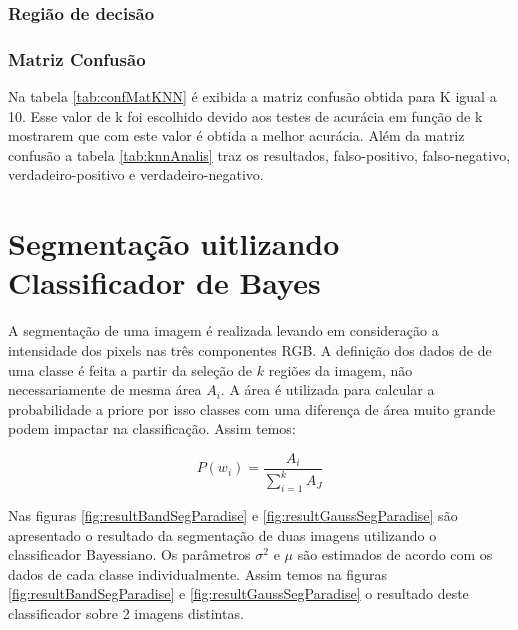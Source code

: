 \documentclass[ 
	article,			%
	11pt,				%
	oneside,			%
	a4paper,			%
	english,			%
	brazil,				%
	]{abntex2}
\begin{document}
\subsubsection{Região de decisão}

\subsubsection{Matriz Confusão}
Na tabela \ref{tab:confMatKNN} é exibida a matriz confusão obtida para K igual a
10. Esse valor de k foi escolhido devido aos testes de acurácia em
função de k mostrarem que com este valor é obtida a melhor acurácia. Além da
matriz confusão  a tabela \ref{tab:knnAnalis} traz os
resultados, falso-positivo, falso-negativo, verdadeiro-positivo e
verdadeiro-negativo. 


\section{Segmentação uitlizando Classificador de Bayes}
 A segmentação de uma imagem é realizada levando em
consideração a intensidade dos pixels nas três componentes RGB.
A definição dos dados de de uma classe é feita a partir da seleção de $k$
regiões da imagem, não necessariamente de mesma área $A_i$. A área é utilizada
para calcular a probabilidade a priore por isso classes com uma diferença de
área muito grande podem impactar na classificação.
Assim temos:

\begin{equation}
	P(w_i) =  \frac{A_i}{\sum_{i=1}^{k}{A_J}}
\end{equation}


Nas figuras \ref{fig:resultBandSegParadise} e \ref{fig:resultGaussSegParadise}
são apresentado o resultado da segmentação de duas imagens utilizando o
classificador Bayessiano. Os parâmetros $\sigma^2$ e $\mu$ são estimados de
acordo com os dados de cada classe individualmente. Assim temos na figuras
\ref{fig:resultBandSegParadise} e \ref{fig:resultGaussSegParadise} o resultado
deste classificador sobre 2 imagens distintas.
\end{document}
